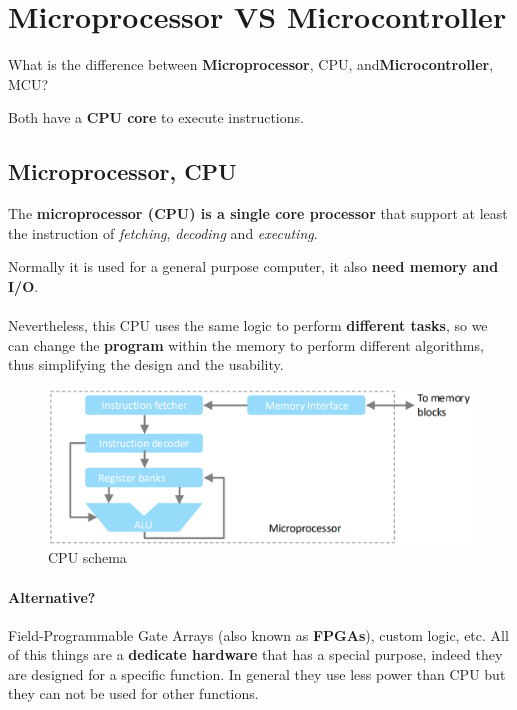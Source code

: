 \section{Microprocessor VS Microcontroller}

What is the difference between  \textbf{Microprocessor}, CPU, and\textbf{Microcontroller}, MCU?


Both have a \textbf{CPU core} to execute instructions.

\subsection{Microprocessor, CPU}

The \textbf{microprocessor (CPU) is a single core processor} that support at least the instruction of \textit{fetching}, \textit{decoding} and \textit{executing}. 

Normally it is used for a general purpose computer, it also \textbf{need memory and I/O}.

\paragraph{}

Nevertheless, this CPU uses the same logic to perform \textbf{different tasks}, so we can change the \textbf{program} within the memory to perform different algorithms, thus simplifying the design and the usability.


\begin{figure}[H]
    \centering
    \includegraphics[width=0.8\linewidth]{img/img2.png}
    \caption{CPU schema}
\end{figure}

\paragraph{Alternative?} Field-Programmable Gate Arrays (also known as \textbf{FPGAs}), custom logic, etc. All of this things are a \textbf{dedicate hardware} that has a special purpose, indeed they are designed for a specific function. In general they use less power than CPU but they can not be used for other functions.

